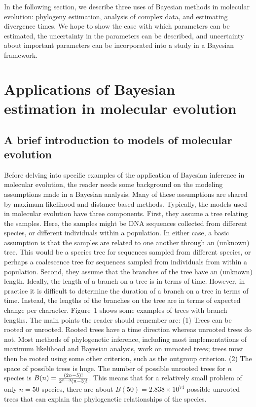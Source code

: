 \documentclass{svmult}
\begin{document}
In the following section, we describe three uses of Bayesian methods in molecular evolution:
phylogeny estimation, analysis of complex data, and estimating divergence times.  We hope to show
the ease with which parameters can be estimated, the uncertainty in the parameters can be
described, and uncertainty about important parameters can be incorporated into a study in a
Bayesian framework.

\section{Applications of Bayesian estimation in molecular evolution}
\label{sec:3}

\subsection{A brief introduction to models of molecular evolution}


Before delving into specific examples of the application of Bayesian inference in molecular
evolution, the reader needs some background on the modeling assumptions made in a Bayesian
analysis. Many of these assumptions are shared by maximum likelihood and distance-based methods.
Typically, the models used in molecular evolution have three components. First, they assume a tree
relating the samples. Here, the samples might be DNA sequences collected from different species, or
different individuals within a population. In either case, a basic assumption is that the samples
are related to one another through an (unknown) tree. This would be a species tree for sequences
sampled from different species, or perhaps a coalescence tree for sequences sampled from
individuals from within a population. Second, they assume that the branches of the tree have an
(unknown) length. Ideally, the length of a branch on a tree is in terms of time. However, in
practice it is difficult to determine the duration of a branch on a tree in terms of time. Instead,
the lengths of the branches on the tree are in terms of expected change per character.  Figure~1
shows some examples of trees with branch lengths. The main points the reader should remember are:
(1) Trees can be rooted or unrooted. Rooted trees have a time direction whereas unrooted trees do
not. Most methods of phylogenetic inference, including most implementations of maximum likelihood
and Bayesian analysis, work on unrooted trees; trees must then be rooted using some other
criterion, such as the outgroup criterion.  (2) The space of possible trees is huge. The number of
possible unrooted trees for $n$ species is $B(n) = {(2n-5)! \over 2^{n-3}(n-3)!}$. This means that
for a relatively small problem of only $n=50$ species, there are about $B(50) = 2.838 \times
10^{74}$ possible unrooted trees that can explain the phylogenetic relationships of the species.
\end{document}
